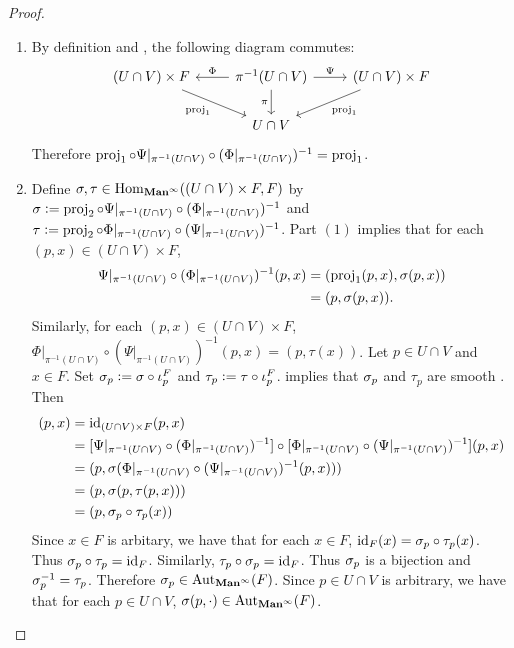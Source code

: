 \documentclass{book}
\begin{document}
	\begin{proof}\
		\begin{enumerate}
			\item By definition and , the following diagram commutes:
			\[ 
			\begin{tikzcd}
				(U \cap V) \times F  \arrow[dr, "\prj_{1}"'] & \pi^{-1}(U \cap V) \arrow[d, "{\pi}"'] \arrow[l, "{\Phi}"'] \arrow[r, "\Psi"] & (U \cap V) \times F \arrow[dl, "{\prj_1}"]  \\
													                & U \cap V
			\end{tikzcd}
			\] 
			Therefore $\operatorname{\text{proj}}_1 \circ \Psi|_{\pi^{-1}(U \cap V)} \circ (\Phi|_{\pi^{-1}(U \cap V)})^{-1} = \operatorname{\text{proj}}_1$.
			\item Define $\sigma, \tau \in \operatorname{Hom}_{\operatorname*{\text{\textbf{Man}}^{\infty}}}(( U \cap V) \times F,  F)$ by $\sigma \vcentcolon= \operatorname{\text{proj}}_2 \circ \Psi|_{\pi^{-1}(U \cap V)} \circ (\Phi|_{\pi^{-1}(U \cap V)})^{-1}$ and $\tau \vcentcolon= \operatorname{\text{proj}}_2 \circ \Phi|_{\pi^{-1}(U \cap V)} \circ (\Psi|_{\pi^{-1}(U \cap V)})^{-1}$. Part $(1)$ implies that for each $(p, x) \in (U \cap V) \times F$, 
			\begin{align*}
				\Psi|_{\pi^{-1}(U \cap V)} \circ (\Phi|_{\pi^{-1}(U \cap V)})^{-1}(p,x) 
				& = (\operatorname{\text{proj}}_1(p,x), \sigma(p,x)) \\
				& = (p, \sigma(p,x)).
			\end{align*} 
			Similarly, for each $(p,x) \in (U \cap V) \times F$, $\Phi|_{\pi^{-1}(U \cap V)} \circ (\Psi|_{\pi^{-1}(U \cap V)})^{-1}(p,x) = (p, \tau(x))$. Let $p \in U \cap V$ and $x \in F$. Set $\sigma_p \vcentcolon= \sigma \circ \iota_p^F$ and $\tau_p \vcentcolon= \tau \circ \iota_p^F$.  implies that $\sigma_p$ and $\tau_p$ are smooth . Then  
			\begin{align*}
				(p, x) 
				& = \operatorname{id}_{(U \cap V) \times F}(p, x) \\
				& = [\Psi|_{\pi^{-1}(U \cap V)} \circ (\Phi|_{\pi^{-1}(U \cap V)})^{-1}] \circ [\Phi|_{\pi^{-1}(U \cap V)} \circ (\Psi|_{\pi^{-1}(U \cap V)})^{-1}](p,x) \\
				& = (p, \sigma (\Phi|_{\pi^{-1}(U \cap V)} \circ (\Psi|_{\pi^{-1}(U \cap V)})^{-1}(p,x))) \\
				& = (p, \sigma(p, \tau(p, x))) \\
				& = (p, \sigma_p \circ \tau_p(x)) 
			\end{align*}
			Since $x \in F$ is arbitary, we have that for each $x \in F$, $\operatorname{id}_F(x) = \sigma_p \circ \tau_p(x)$. Thus $\sigma_p \circ \tau_p = \operatorname{id}_F$. Similarly, $\tau_p \circ \sigma_p = \operatorname{id}_F$. Thus $\sigma_p$ is a bijection and $\sigma_p^{-1} = \tau_p$. Therefore $\sigma_p \in \operatorname{Aut}_{\operatorname*{\text{\textbf{Man}}^{\infty}}}(F)$. Since $p \in U \cap V$ is arbitrary, we have that for each $p \in U \cap V$, $\sigma(p, \cdot) \in \operatorname{Aut}_{\operatorname*{\text{\textbf{Man}}^{\infty}}}(F)$. 
		\end{enumerate}
	\end{proof}
\end{document}
